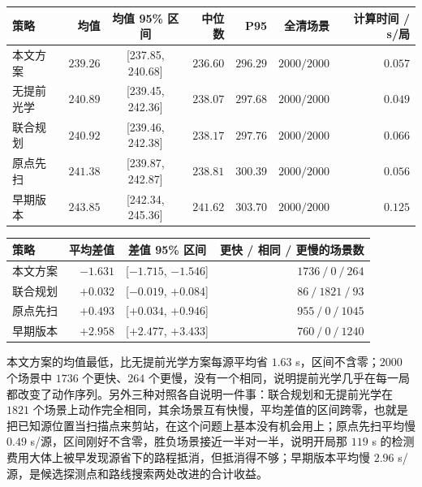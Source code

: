 \Needspace{46mm}
\begin{center}
\begin{minipage}{\linewidth}
\centering\small
{}
\label{tab:q3-main}
\vspace{4pt}
\begin{tabular}{@{}lrcrrrr@{}}
\toprule
策略 & 均值 & 均值 95\% 区间 & 中位数 & P95 & 全清场景 & 计算时间 / s/局 \\
\midrule
本文方案 & $239.26$ & {[}237.85, 240.68{]} & $236.60$ & $296.29$ & $2000/2000$ & $0.057$ \\
无提前光学 & $240.89$ & {[}239.45, 242.36{]} & $238.07$ & $297.68$ & $2000/2000$ & $0.049$ \\
联合规划 & $240.92$ & {[}239.46, 242.38{]} & $238.17$ & $297.76$ & $2000/2000$ & $0.066$ \\
原点先扫 & $241.38$ & {[}239.87, 242.87{]} & $238.81$ & $300.39$ & $2000/2000$ & $0.056$ \\
早期版本 & $243.85$ & {[}242.34, 245.36{]} & $241.62$ & $303.70$ & $2000/2000$ & $0.125$ \\
\bottomrule
\end{tabular}
\end{minipage}
\end{center}

\Needspace{40mm}
\begin{center}
\begin{minipage}{\linewidth}
\centering\small
{}
\label{tab:q3-paired}
\vspace{4pt}
\begin{tabular}{@{}lrcr@{}}
\toprule
策略 & 平均差值 & 差值 95\% 区间 & 更快 / 相同 / 更慢的场景数 \\
\midrule
本文方案 & $-1.631$ & {[}$-1.715$, $-1.546${]} & $1736\ /\ 0\ /\ 264$ \\
联合规划 & $+0.032$ & {[}$-0.019$, $+0.084${]} & $86\ /\ 1821\ /\ 93$ \\
原点先扫 & $+0.493$ & {[}$+0.034$, $+0.946${]} & $955\ /\ 0\ /\ 1045$ \\
早期版本 & $+2.958$ & {[}$+2.477$, $+3.433${]} & $760\ /\ 0\ /\ 1240$ \\
\bottomrule
\end{tabular}
\end{minipage}
\end{center}

本文方案的均值最低，比无提前光学方案每源平均省 $1.63$ s，区间不含零；$2000$ 个场景中 $1736$ 个更快、$264$ 个更慢，没有一个相同，说明提前光学几乎在每一局都改变了动作序列。另外三种对照各自说明一件事：联合规划和无提前光学在 $1821$ 个场景上动作完全相同，其余场景互有快慢，平均差值的区间跨零，也就是把已知源位置当扫描点来剪站，在这个问题上基本没有机会用上；原点先扫平均慢 $0.49$ s/源，区间刚好不含零，胜负场景接近一半对一半，说明开局那 $119$ s 的检测费用大体上被早发现源省下的路程抵消，但抵消得不够；早期版本平均慢 $2.96$ s/源，是候选探测点和路线搜索两处改进的合计收益。

